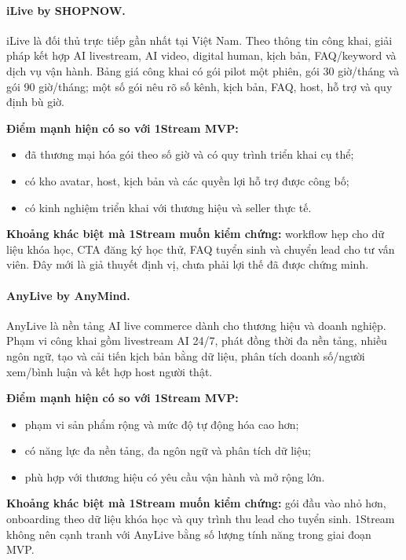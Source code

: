 \paragraph{iLive by SHOPNOW.}
iLive là đối thủ trực tiếp gần nhất tại Việt Nam. Theo thông tin công khai, giải
pháp kết hợp AI livestream, AI video, digital human, kịch bản, FAQ/keyword và
dịch vụ vận hành. Bảng giá công khai có gói pilot một phiên, gói 30 giờ/tháng và
gói 90 giờ/tháng; một số gói nêu rõ số kênh, kịch bản, FAQ, host, hỗ trợ và quy
định bù giờ.

\textbf{Điểm mạnh hiện có so với 1Stream MVP:}
\begin{itemize}
    \item đã thương mại hóa gói theo số giờ và có quy trình triển khai cụ thể;
    \item có kho avatar, host, kịch bản và các quyền lợi hỗ trợ được công bố;
    \item có kinh nghiệm triển khai với thương hiệu và seller thực tế.
\end{itemize}

\textbf{Khoảng khác biệt mà 1Stream muốn kiểm chứng:}
workflow hẹp cho dữ liệu khóa học, CTA đăng ký học thử, FAQ tuyển sinh và chuyển
lead cho tư vấn viên. Đây mới là giả thuyết định vị, chưa phải lợi thế đã được
chứng minh.

\paragraph{AnyLive by AnyMind.}
AnyLive là nền tảng AI live commerce dành cho thương hiệu và doanh nghiệp. Phạm
vi công khai gồm livestream AI 24/7, phát đồng thời đa nền tảng, nhiều ngôn ngữ,
tạo và cải tiến kịch bản bằng dữ liệu, phân tích doanh số/người xem/bình luận và
kết hợp host người thật.

\textbf{Điểm mạnh hiện có so với 1Stream MVP:}
\begin{itemize}
    \item phạm vi sản phẩm rộng và mức độ tự động hóa cao hơn;
    \item có năng lực đa nền tảng, đa ngôn ngữ và phân tích dữ liệu;
    \item phù hợp với thương hiệu có yêu cầu vận hành và mở rộng lớn.
\end{itemize}

\textbf{Khoảng khác biệt mà 1Stream muốn kiểm chứng:}
gói đầu vào nhỏ hơn, onboarding theo dữ liệu khóa học và quy trình thu lead cho
tuyển sinh. 1Stream không nên cạnh tranh với AnyLive bằng số lượng tính năng trong
giai đoạn MVP.

